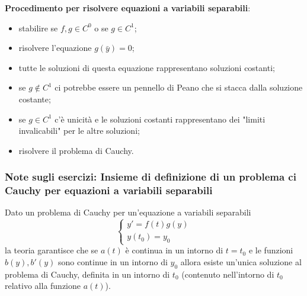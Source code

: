 \newline
\textbf{Procedimento per risolvere equazioni a variabili separabili}:
\begin{itemize}
    \item stabilire se $f,g \in C^0$ o se $g \in C^1$;
    \item risolvere l'equazione $g(\bar{y}) = 0$;
    \item tutte le soluzioni di questa equazione rappresentano soluzioni costanti;
    \item se $g \notin C^1$ ci potrebbe essere un pennello di Peano che si stacca dalla soluzione costante;
    \item se $g \in C^1$ c'è unicità e le soluzioni costanti rappresentano dei "limiti invalicabili" per le altre soluzioni;
    \item risolvere il problema di Cauchy.
\end{itemize}
\subsubsection{Note sugli esercizi: Insieme di definizione di un problema ci Cauchy per equazioni a variabili separabili}
Dato un problema di Cauchy per un'equazione a variabili separabili
\[
    \begin{cases}
        y' = f(t) g(y) \\ y(t_0) = y_0
    \end{cases}
\]
la teoria garantisce che se $a(t)$ è continua in un intorno di $t = t_0$ e le funzioni $b(y), b'(y)$ sono continue in un intorno di $y_0$ allora esiste un'unica soluzione al problema di Cauchy, definita in un intorno di $t_0$ (contenuto nell'intorno di $t_0$ relativo alla funzione $a(t)$).
